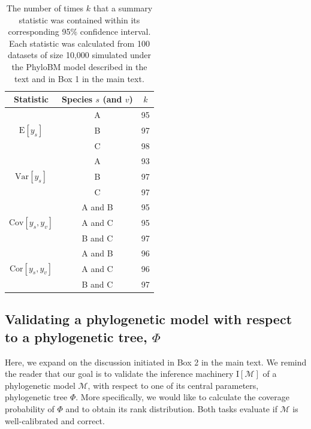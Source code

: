 \documentclass[oneside]{article}
\begin{document}
\begin{table}[h]
  \caption{The number of times $k$ that a summary statistic was contained within its corresponding 95\% confidence interval.
    Each statistic was calculated from 100 datasets of size 10,000 simulated under the PhyloBM model described in the text and in Box 1 in the main text.}
  \label{suptab:bmsimcis}
  \centering
  \begin{tabular}{ ccc }
    \hline
    Statistic & Species $s$ (and $v$)& $k$\\
    \hline  
    \rowcolor{gray!10}                      & A & 95\\
    \rowcolor{gray!10} $\text{E}[y_s]$      & B & 97\\
    \rowcolor{gray!10}                      & C & 98\\
                                            & A & 93\\
                       $\text{Var}[y_s]$    & B & 97\\
                                            & C & 97\\
    \rowcolor{gray!10}                      & A and B & 95\\
    \rowcolor{gray!10}$\text{Cov}[y_s,y_v]$ & A and C & 95\\
    \rowcolor{gray!10}                      & B and C & 97\\
                                            & A and B & 96\\
                      $\text{Cor}[y_s,y_v]$ & A and C & 96\\
                                            & B and C & 97\\
    \hline
  \end{tabular}
\end{table}

\subsection{Validating a phylogenetic model with respect to a phylogenetic tree, $\Phi$}
\label{sec::app::ruv_topology}

Here, we expand on the discussion initiated in Box 2 in the main text.
We remind the reader that our goal is to validate the inference machinery
$\text{I}[\mathcal{M}]$ of a phylogenetic model $\mathcal{M}$, with
respect to one of its central parameters, phylogenetic tree $\Phi$.
More specifically, we would like to calculate the coverage probability of
$\Phi$ and to obtain its rank distribution.
Both tasks evaluate if $\mathcal{M}$ is well-calibrated and correct.
\end{document}
